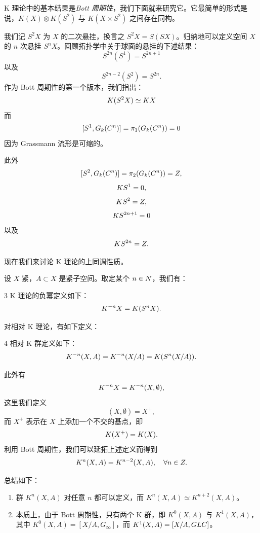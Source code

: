 K 理论中的基本结果是\emph{Bott 周期性}，我们下面就来研究它。它最简单的形式是说，$K(X)\otimes K(S^2)$ 与 $K(X\times S^2)$ 之间存在同构。

我们记 $S^2X$ 为 $X$ 的二次悬挂，换言之 $S^2X = S(SX)$。归纳地可以定义空间 $X$ 的 $n$ 次悬挂 $S^nX$。回顾拓扑学中关于球面的悬挂的下述结果：
\[ S^{2n}(S^1) = S^{2n+1} \]
以及
\[ S^{2n-2}(S^2) = S^{2n}. \]
作为 Bott 周期性的第一个版本，我们指出：
\[  K(S^2X) \simeq  K X \]
而
\[ [S^1, G_k(C^n)] = \pi_1(G_k(C^n)) = 0 \]
因为 Grassmann 流形是可缩的。


此外
\[ [S^2, G_k(C^n)] = \pi_2(G_k(C^n)) = Z, \]
\[  K S^1 = 0, \]
\[  K S^2 = Z, \]
\[  K S^{2n+1} = 0 \]
以及
\[  K S^{2n} = Z. \]

现在我们来讨论 K 理论的上同调性质。

设 $X$ 紧，$A\subset X$ 是紧子空间。取定某个 $n\in N$，我们有：

\begin{defn}{3}
K 理论的负幂定义如下：
\[  K^{-n}X =  K(S^nX). \]
\end{defn}

对相对 K 理论，有如下定义：

\begin{defn}{4}
相对 K 群定义如下：
\[  K^{-n}(X,A) =  K^{-n}(X/A) =  K(S^n(X/A)). \]
\end{defn}

此外有
\[ K^{-n}X =  K^{-n}(X,\emptyset), \]
这里我们定义
\[ (X,\emptyset) = X^+, \]
而 $X^+$ 表示在 $X$ 上添加一个不交的基点，即
\[  K(X^+) = K(X). \]
利用 Bott 周期性，我们可以延拓上述定义而得到
\[ K^n(X,A) = K^{n-2}(X,A),\quad \forall n\in Z. \]

总结如下：

\begin{enumerate}[label=\arabic*.]
\item 群 $K^n(X,A)$ 对任意 $n$ 都可以定义，而 $K^n(X,A)\simeq K^{n+2}(X,A)$。
\item 本质上，由于 Bott 周期性，只有两个 K 群，即 $K^0(X,A)$ 与 $K^1(X,A)$，其中 $K^0(X,A) = [X/A, G_\infty]$，而 $K^1(X,A) = [X/A, GLC]$。
\end{enumerate}


